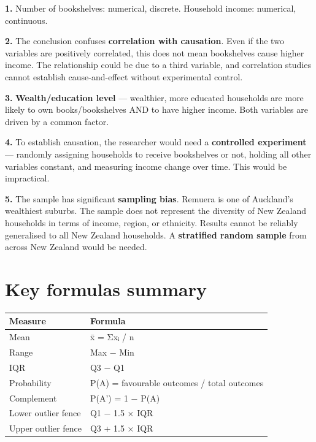 \documentclass[
  11pt,
  a4paper,
  oneside,
  open=any]{scrbook}
\begin{document}
\begin{tcolorbox}[enhanced jigsaw, breakable, leftrule=.75mm, bottomtitle=1mm, bottomrule=.15mm, titlerule=0mm, left=2mm, opacitybacktitle=0.6, coltitle=black, colbacktitle=quarto-callout-note-color!10!white, rightrule=.15mm, title=\textcolor{quarto-callout-note-color}{\faInfo}\hspace{0.5em}{Model answers}, toptitle=1mm, arc=.35mm, colback=white, toprule=.15mm, colframe=quarto-callout-note-color-frame, opacityback=0]

\textbf{1.} Number of bookshelves: numerical, discrete. Household
income: numerical, continuous.

\textbf{2.} The conclusion confuses \textbf{correlation with causation}.
Even if the two variables are positively correlated, this does not mean
bookshelves cause higher income. The relationship could be due to a
third variable, and correlation studies cannot establish
cause-and-effect without experimental control.

\textbf{3.} \textbf{Wealth/education level} --- wealthier, more educated
households are more likely to own books/bookshelves AND to have higher
income. Both variables are driven by a common factor.

\textbf{4.} To establish causation, the researcher would need a
\textbf{controlled experiment} --- randomly assigning households to
receive bookshelves or not, holding all other variables constant, and
measuring income change over time. This would be impractical.

\textbf{5.} The sample has significant \textbf{sampling bias}. Remuera
is one of Auckland's wealthiest suburbs. The sample does not represent
the diversity of New Zealand households in terms of income, region, or
ethnicity. Results cannot be reliably generalised to all New Zealand
households. A \textbf{stratified random sample} from across New Zealand
would be needed.

\end{tcolorbox}

\section{Key formulas summary}\label{key-formulas-summary}

\begin{longtable}[]{@{}ll@{}}
\toprule\noalign{}
Measure & Formula \\
\midrule\noalign{}
\endhead
\bottomrule\noalign{}
\endlastfoot
Mean & x̄ = Σxᵢ / n \\
Range & Max − Min \\
IQR & Q3 − Q1 \\
Probability & P(A) = favourable outcomes / total outcomes \\
Complement & P(A') = 1 − P(A) \\
Lower outlier fence & Q1 − 1.5 × IQR \\
Upper outlier fence & Q3 + 1.5 × IQR \\
\end{longtable}
\end{document}
